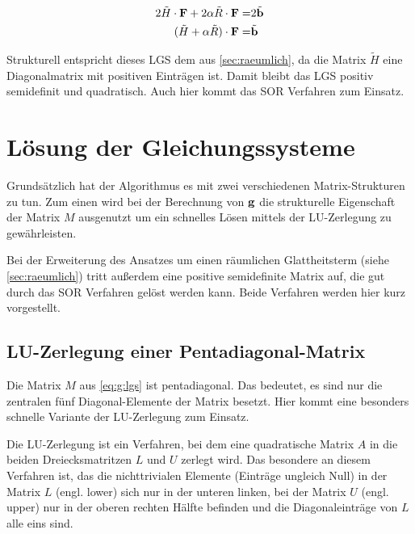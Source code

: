 \begin{align}
2 \tilde H \cdot \mathbf F + 2 \alpha \tilde R\cdot \mathbf F =& 2 \tilde{\mathbf b} \\
(\tilde H+\alpha \tilde R)\cdot \mathbf F =& \tilde{\mathbf b}
\end{align}

Strukturell entspricht dieses LGS dem aus \autoref{sec:raeumlich}, da die Matrix $\tilde H$ eine Diagonalmatrix mit positiven Einträgen ist. Damit bleibt das LGS positiv semidefinit und quadratisch. Auch hier kommt das \gls{SOR} Verfahren zum Einsatz.




\section{Lösung der Gleichungssysteme}
Grundsätzlich hat der Algorithmus es mit zwei verschiedenen Matrix-Strukturen zu tun. Zum einen wird bei der Berechnung von $\mathbf g$ die strukturelle Eigenschaft der Matrix $M$ ausgenutzt um ein schnelles Lösen mittels der LU-Zerlegung zu gewährleisten.

Bei der Erweiterung des Ansatzes um einen räumlichen Glattheitsterm (siehe \autoref{sec:raeumlich}) tritt außerdem eine positive semidefinite Matrix auf, die gut durch das \gls{SOR} Verfahren gelöst werden kann. Beide Verfahren werden hier kurz vorgestellt.



\subsection{LU-Zerlegung einer Pentadiagonal-Matrix}
\label{sec:maths:lu}
Die Matrix $M$ aus \autoref{eq:g:lgs} ist pentadiagonal. Das bedeutet, es sind nur die zentralen fünf Diagonal-Elemente der Matrix besetzt. Hier kommt eine besonders schnelle Variante der LU-Zerlegung zum Einsatz.

Die LU-Zerlegung ist ein Verfahren, bei dem eine quadratische Matrix $A$ in die beiden Dreiecksmatritzen $L$ und $U$ zerlegt wird. Das besondere an diesem Verfahren ist, das die nichttrivialen Elemente (Einträge ungleich Null) in der Matrix $L$ (engl. lower) sich nur in der unteren linken, bei der Matrix $U$ (engl. upper) nur in der oberen rechten Hälfte befinden und die Diagonaleinträge von $L$ alle eins sind. 

